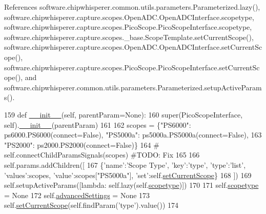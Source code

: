 References software.\+chipwhisperer.\+common.\+utils.\+parameters.\+Parameterized.\+lazy(), software.\+chipwhisperer.\+capture.\+scopes.\+Open\+A\+D\+C.\+Open\+A\+D\+C\+Interface.\+scopetype, software.\+chipwhisperer.\+capture.\+scopes.\+Pico\+Scope.\+Pico\+Scope\+Interface.\+scopetype, software.\+chipwhisperer.\+capture.\+scopes.\+\_\+base.\+Scope\+Template.\+set\+Current\+Scope(), software.\+chipwhisperer.\+capture.\+scopes.\+Open\+A\+D\+C.\+Open\+A\+D\+C\+Interface.\+set\+Current\+Scope(), software.\+chipwhisperer.\+capture.\+scopes.\+Pico\+Scope.\+Pico\+Scope\+Interface.\+set\+Current\+Scope(), and software.\+chipwhisperer.\+common.\+utils.\+parameters.\+Parameterized.\+setup\+Active\+Params().


\begin{DoxyCode}
159     \textcolor{keyword}{def }\hyperlink{classsoftware_1_1chipwhisperer_1_1capture_1_1scopes_1_1PicoScope_1_1PicoScopeInterface_acabbf01f16afdcf09eab4c02baab16b1}{\_\_init\_\_}(self, parentParam=None):
160         super(PicoScopeInterface, self).\hyperlink{classsoftware_1_1chipwhisperer_1_1capture_1_1scopes_1_1PicoScope_1_1PicoScopeInterface_acabbf01f16afdcf09eab4c02baab16b1}{\_\_init\_\_}(parentParam)
161 
162         scopes = \{\textcolor{stringliteral}{"PS6000"}: ps6000.PS6000(connect=\textcolor{keyword}{False}), \textcolor{stringliteral}{"PS5000a"}: ps5000a.PS5000a(connect=\textcolor{keyword}{False}),
163                   \textcolor{stringliteral}{"PS2000"}: ps2000.PS2000(connect=\textcolor{keyword}{False})\}
164         \textcolor{comment}{# self.connectChildParamsSignals(scopes) #TODO: Fix}
165 
166         self.params.addChildren([
167             \{\textcolor{stringliteral}{'name'}:\textcolor{stringliteral}{'Scope Type'}, \textcolor{stringliteral}{'key'}:\textcolor{stringliteral}{'type'}, \textcolor{stringliteral}{'type'}:\textcolor{stringliteral}{'list'}, \textcolor{stringliteral}{'values'}:scopes, \textcolor{stringliteral}{'value'}:scopes[\textcolor{stringliteral}{"PS5000a"}], \textcolor{stringliteral}{
      'set'}:self.\hyperlink{classsoftware_1_1chipwhisperer_1_1capture_1_1scopes_1_1PicoScope_1_1PicoScopeInterface_a323e934bd546825ab8fc3f8ace3638ee}{setCurrentScope}\}
168         ])
169         self.setupActiveParams([\textcolor{keyword}{lambda}: self.lazy(self.\hyperlink{classsoftware_1_1chipwhisperer_1_1capture_1_1scopes_1_1PicoScope_1_1PicoScopeInterface_ae87a5f8e59f87a8a19609b2dba4266ee}{scopetype})])
170 
171         self.\hyperlink{classsoftware_1_1chipwhisperer_1_1capture_1_1scopes_1_1PicoScope_1_1PicoScopeInterface_ae87a5f8e59f87a8a19609b2dba4266ee}{scopetype} = \textcolor{keywordtype}{None}
172         self.\hyperlink{classsoftware_1_1chipwhisperer_1_1capture_1_1scopes_1_1PicoScope_1_1PicoScopeInterface_a9aebcb97eacec83777d81e6d73f78929}{advancedSettings} = \textcolor{keywordtype}{None}
173         self.\hyperlink{classsoftware_1_1chipwhisperer_1_1capture_1_1scopes_1_1PicoScope_1_1PicoScopeInterface_a323e934bd546825ab8fc3f8ace3638ee}{setCurrentScope}(self.findParam(\textcolor{stringliteral}{'type'}).value())
174 
\end{DoxyCode}


